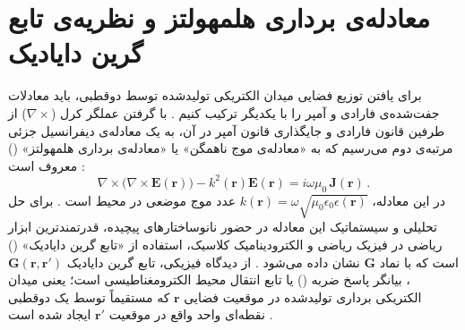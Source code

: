 \documentclass[12pt,a4paper]{report}
\begin{document}
\section{معادله‌ی برداری هلمهولتز و نظریه‌ی تابع گرین دایادیک}
برای یافتن توزیع فضایی میدان الکتریکی تولیدشده توسط دوقطبی، باید معادلات جفت‌شده‌ی فارادی و آمپر را با یکدیگر ترکیب کنیم \cite{novotny}. با گرفتن عملگر کرل ($\nabla\times$) از طرفین قانون فارادی و جایگذاری قانون آمپر در آن، به یک معادله‌ی دیفرانسیل جزئی مرتبه‌ی دوم می‌رسیم که به «معادله‌ی موج ناهمگن» یا «معادله‌ی برداری هلمهولتز» () معروف است \cite{novotny}:
\begin{equation}
\nabla\times\big(\nabla\times\mathbf{E}(\mathbf{r})\big)-k^2(\mathbf{r})\mathbf{E}(\mathbf{r})=i\omega\mu_0\,\mathbf{J}(\mathbf{r})\,.
\end{equation}
در این معادله، $k(\mathbf{r})=\omega\sqrt{\mu_0\epsilon_0\epsilon(\mathbf{r})}$ عدد موج موضعی در محیط است \cite{novotny}. برای حل تحلیلی و سیستماتیک این معادله در حضور نانوساختارهای پیچیده، قدرتمندترین ابزار ریاضی در فیزیک ریاضی و الکترودینامیک کلاسیک، استفاده از «تابع گرین دایادیک» () است که با نماد $\mathbf{G}$ نشان داده می‌شود \cite{novotny}. از دیدگاه فیزیکی، تابع گرین دایادیک $\mathbf{G}(\mathbf{r},\mathbf{r}')$، بیانگر پاسخ ضربه () یا تابع انتقال محیط الکترومغناطیسی است؛ یعنی میدان الکتریکی برداری تولیدشده در موقعیت فضایی $\mathbf{r}$ که مستقیماً توسط یک دوقطبی نقطه‌ای واحد واقع در موقعیت $\mathbf{r}'$ ایجاد شده است \cite{novotny}.
\end{document}
